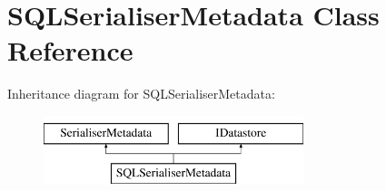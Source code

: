 \hypertarget{class_s_q_l_serialiser_metadata}{}\section{S\+Q\+L\+Serialiser\+Metadata Class Reference}
\label{class_s_q_l_serialiser_metadata}
Inheritance diagram for S\+Q\+L\+Serialiser\+Metadata\+:\begin{figure}[H]
\begin{center}
\leavevmode
\includegraphics[height=2.000000cm]{class_s_q_l_serialiser_metadata}
\end{center}
\end{figure}
